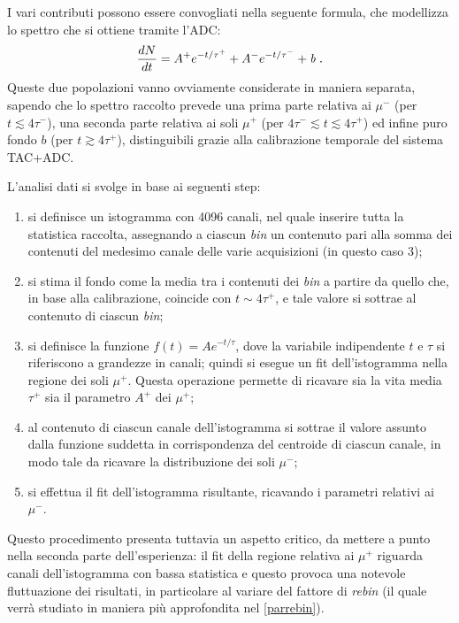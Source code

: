 \documentclass[10pt, oneside, a4paper]{article}   	%
\begin{document}
I vari contributi possono essere convogliati nella seguente formula, che modellizza lo spettro che si ottiene tramite l'ADC:
 \[  \frac{dN}{dt} = A^+ e^{-t/\tau^+} + A^- e^{-t/\tau^-} + \mbox{\emph{b\;.}} \]
Queste due popolazioni vanno ovviamente considerate in maniera separata, sapendo che lo spettro raccolto prevede una prima parte relativa ai $\mu^-$ (per $t\lesssim4\tau^-$), una seconda parte relativa ai soli $\mu^+$ (per $4\tau^-\lesssim t\lesssim 4\tau^+$) ed infine puro fondo $b$ (per $t\gtrsim4\tau^+$), distinguibili grazie alla calibrazione temporale del sistema TAC+ADC.

L'analisi dati si svolge in base ai seguenti step:
\begin{enumerate}
	\item si definisce un istogramma con 4096 canali, nel quale inserire tutta la statistica raccolta, assegnando a ciascun \emph{bin} un contenuto pari alla somma dei contenuti del medesimo canale delle varie acquisizioni (in questo caso 3);
	\item si stima il fondo come la media tra i contenuti dei \emph{bin} a partire da quello che, in base alla calibrazione, coincide con $t\sim 4\tau^+$, e tale valore si sottrae al contenuto di ciascun \emph{bin};
	\item si definisce la funzione $f(t)=Ae^{-t/\tau}$, dove la variabile indipendente $t$ e $\tau$ si riferiscono a grandezze in canali; quindi si esegue un fit dell'istogramma nella regione dei soli $\mu^+$. Questa operazione permette di ricavare sia la vita media $\tau^+$ sia il parametro $A^+$ dei $\mu^+$; 
	\item al contenuto di ciascun canale dell'istogramma si sottrae il valore assunto dalla funzione suddetta in corrispondenza del centroide di ciascun canale, in modo tale da ricavare la distribuzione dei soli $\mu^-$;
	\item si effettua il fit dell'istogramma risultante, ricavando i parametri relativi ai $\mu^-$.
\end{enumerate}
Questo procedimento presenta tuttavia un aspetto critico, da mettere a punto nella seconda parte dell'esperienza: il fit della regione relativa ai $\mu^+$ riguarda canali dell'istogramma con bassa statistica e questo provoca una notevole fluttuazione dei risultati, in particolare al variare del fattore di \emph{rebin} (il quale verrà studiato in maniera più approfondita nel \cref{parrebin}).
\end{document}
